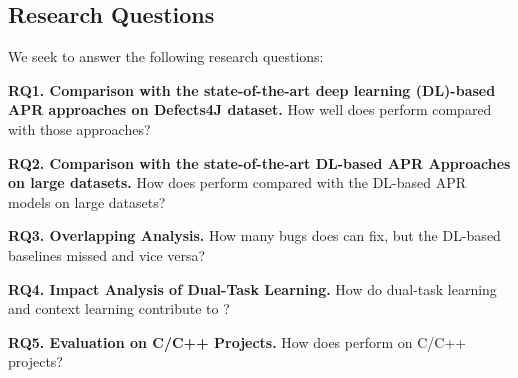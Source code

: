 \subsection{Research Questions}

We seek to answer the following research questions:

\noindent\textbf{RQ1. Comparison with the state-of-the-art deep learning
  (DL)-based APR approaches on Defects4J dataset.}  How well does
                {\tool} perform compared with those approaches?



\noindent\textbf{RQ2. Comparison with the state-of-the-art DL-based APR Approaches on large datasets.}  
How does {\tool} perform compared with the DL-based APR models on large datasets?


\noindent\textbf{RQ3. Overlapping Analysis.} How many bugs does
                {\tool} can fix, but the DL-based baselines missed and
                vice versa?

\noindent\textbf{RQ4. Impact Analysis of Dual-Task Learning.} How do
dual-task learning and context learning contribute to {\tool}?


\noindent\textbf{RQ5. Evaluation on C/C++ Projects.} How does {\tool} perform on C/C++ projects?

